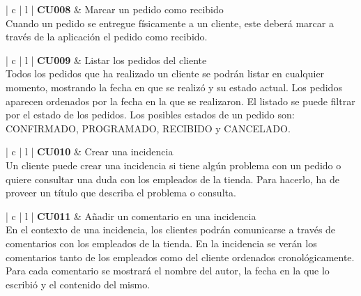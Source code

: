 \documentclass[11pt,spanish,listoffigures]{tfgetsinf}
\begin{document}
\begin{center}
\begin{tabular}{ | c | l | }
\hline
\textbf{ CU008 } & Marcar un pedido como recibido \\
\hline
{}
{
Cuando un pedido se entregue físicamente a un cliente, este deberá marcar a través de la aplicación el pedido como recibido.
} \\
\hline
\end{tabular}
\end{center}

\begin{center}
\begin{tabular}{ | c | l | }
\hline
\textbf{ CU009 } & Listar los pedidos del cliente \\
\hline
{}
{
Todos los pedidos que ha realizado un cliente se podrán listar en cualquier momento, mostrando la fecha en que se realizó y su estado actual. Los pedidos aparecen ordenados por la fecha en la que se realizaron. El listado se puede filtrar por el estado de los pedidos. Los posibles estados de un pedido son: CONFIRMADO, PROGRAMADO, RECIBIDO y CANCELADO.
} \\
\hline
\end{tabular}
\end{center}

\begin{center}
\begin{tabular}{ | c | l | }
\hline
\textbf{ CU010 } & Crear una incidencia \\
\hline
{}
{
Un cliente puede crear una incidencia si tiene algún problema con un pedido o quiere consultar una duda con los empleados de la tienda. Para hacerlo, ha de proveer un título que describa el problema o consulta.
} \\
\hline
\end{tabular}
\end{center}

\begin{center}
\begin{tabular}{ | c | l | }
\hline
\textbf{ CU011 } & Añadir un comentario en una incidencia \\
\hline
{}
{
En el contexto de una incidencia, los clientes podrán comunicarse a través de comentarios con los empleados de la tienda. En la incidencia se verán los comentarios tanto de los empleados como del cliente ordenados cronológicamente. Para cada comentario se mostrará el nombre del autor, la fecha en la que lo escribió y el contenido del mismo.
} \\
\hline
\end{tabular}
\end{center}
\end{document}
